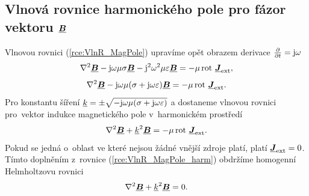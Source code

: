 \subsection*{Vlnová rovnice harmonického pole pro fázor vektoru $\mbox{\underline{\boldmath$B$}}$}
Vlnovou rovnici (\ref{rce:VlnR_MagPole}) upravíme opět obrazem derivace $\frac{\partial}{\partial t}=\mathrm{j}\omega$
\begin{displaymath}
	\nabla^{2}\mbox{\underline{\boldmath$B$}} - \mathrm{j}\omega\mu\sigma\mbox{\underline{\boldmath$B$}} - \mathrm{j}^{2}\omega^{2}\mu\varepsilon\mbox{\underline{\boldmath$B$}} = -\mu\,\mathrm{rot}\ \mbox{\underline{\boldmath$J$}}_{\mathrm{ext}},
\end{displaymath}
\begin{displaymath}
	\nabla^{2}\mbox{\underline{\boldmath$B$}} - \mathrm{j}\omega\mu(\sigma + \mathrm{j}\omega\varepsilon)\mbox{\underline{\boldmath$B$}} = -\mu\,\mathrm{rot}\ \mbox{\underline{\boldmath$J$}}_{\mathrm{ext}}.
\end{displaymath}
Pro konstantu šíření ${\underline{k}}=\pm\sqrt{-\mathrm{j}\omega\mu(\sigma+\mathrm{j}\omega\varepsilon)}$ a dostaneme vlnovou rovnici pro~vektor indukce magnetického pole v~harmonickém prostředí
\begin{equation}
	\nabla^{2}\mbox{\underline{\boldmath$B$}} +{\underline{k}}^{2}\mbox{\underline{\boldmath$B$}} = -\mu\,\mathrm{rot}\ \mbox{\underline{\boldmath$J$}}_{\mathrm{ext}}.
	\label{rce:VlnR_MagPole_harm} 
\end{equation}
Pokud se jedná o~oblast ve které nejsou žádné vnější zdroje platí, platí $\mbox{\underline{\boldmath$J$}}_{\mathrm{ext}} = 0$. Tímto doplněním z~rovnice  (\ref{rce:VlnR_MagPole_harm}) obdržíme homogenní Helmholtzovu rovnici
\begin{equation}
	\nabla^{2}\mbox{\underline{\boldmath$B$}} +{\underline{k}}^{2}\mbox{\underline{\boldmath$B$}} = 0.
	\label{rce:VlnR_MagPole_harm_BezZdroju} 
\end{equation}


